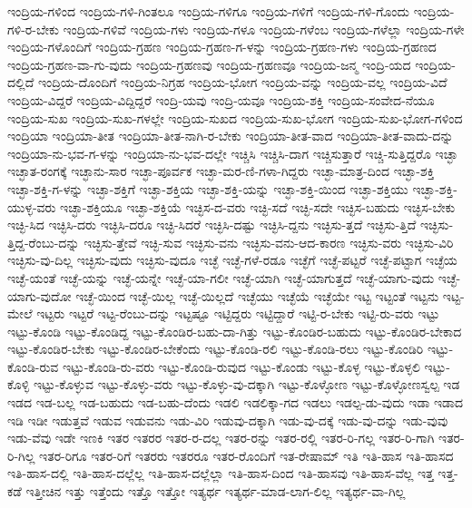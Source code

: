 {ಇಂದ್ರಿಯ-ಗಳಿಂದ
ಇಂದ್ರಿಯ-ಗಳಿ-ಗಿಂತಲೂ
ಇಂದ್ರಿಯ-ಗಳಿಗೂ
ಇಂದ್ರಿಯ-ಗಳಿಗೆ
ಇಂದ್ರಿಯ-ಗಳಿ-ಗೊಂದು
ಇಂದ್ರಿಯ-ಗಳಿ-ರ-ಬೇಕು
ಇಂದ್ರಿಯ-ಗಳಿವೆ
ಇಂದ್ರಿಯ-ಗಳು
ಇಂದ್ರಿಯ-ಗಳೂ
ಇಂದ್ರಿಯ-ಗಳೆಂಬ
ಇಂದ್ರಿಯ-ಗಳೆಲ್ಲಾ
ಇಂದ್ರಿಯ-ಗಳೇ
ಇಂದ್ರಿಯ-ಗಳೊಂದಿಗೆ
ಇಂದ್ರಿಯ-ಗ್ರಹಣ
ಇಂದ್ರಿಯ-ಗ್ರಹಣ-ಗ-ಳನ್ನು
ಇಂದ್ರಿಯ-ಗ್ರಹಣ-ಗಳು
ಇಂದ್ರಿಯ-ಗ್ರಹಣದ
ಇಂದ್ರಿಯ-ಗ್ರಹಣ-ವಾ-ಗು-ವುದು
ಇಂದ್ರಿಯ-ಗ್ರಹಣವು
ಇಂದ್ರಿಯ-ಗ್ರಹಣವೂ
ಇಂದ್ರಿಯ-ಜನ್ಮ
ಇಂದ್ರಿ-ಯದ
ಇಂದ್ರಿಯ-ದಲ್ಲಿದೆ
ಇಂದ್ರಿಯ-ದೊಂದಿಗೆ
ಇಂದ್ರಿಯ-ನಿಗ್ರಹ
ಇಂದ್ರಿಯ-ಭೋಗ
ಇಂದ್ರಿಯ-ವನ್ನು
ಇಂದ್ರಿಯ-ವಲ್ಲ
ಇಂದ್ರಿಯ-ವಿದೆ
ಇಂದ್ರಿಯ-ವಿದ್ದರೆ
ಇಂದ್ರಿಯ-ವಿದ್ದಿದ್ದರೆ
ಇಂದ್ರಿ-ಯವು
ಇಂದ್ರಿ-ಯವೂ
ಇಂದ್ರಿಯ-ಶಕ್ತಿ
ಇಂದ್ರಿಯ-ಸಂವೇದ-ನೆಯೂ
ಇಂದ್ರಿಯ-ಸುಖ
ಇಂದ್ರಿಯ-ಸುಖ-ಗಳಲ್ಲೇ
ಇಂದ್ರಿಯ-ಸುಖದ
ಇಂದ್ರಿಯ-ಸುಖ-ಭೋಗ
ಇಂದ್ರಿಯ-ಸುಖ-ಭೋಗ-ಗಳಿಂದ
ಇಂದ್ರಿಯಾ
ಇಂದ್ರಿಯಾ-ತೀತ
ಇಂದ್ರಿಯಾ-ತೀತ-ನಾಗಿ-ರ-ಬೇಕು
ಇಂದ್ರಿಯಾ-ತೀತ-ವಾದ
ಇಂದ್ರಿಯಾ-ತೀತ-ವಾದು-ದನ್ನು
ಇಂದ್ರಿಯಾ-ನು-ಭವ-ಗ-ಳನ್ನು
ಇಂದ್ರಿಯಾ-ನು-ಭವ-ದಲ್ಲೇ
ಇಚ್ಚಿಸಿ
ಇಚ್ಚಿಸಿ-ದಾಗ
ಇಚ್ಚಿಸುತ್ತಾರೆ
ಇಚ್ಚಿ-ಸುತ್ತಿದ್ದರೊ
ಇಚ್ಛಾ
ಇಚ್ಛಾತ-ರಂಗಕ್ಕೆ
ಇಚ್ಛಾನು-ಸಾರ
ಇಚ್ಛಾ-ಪೂರ್ವಕ
ಇಚ್ಛಾ-ಮರ-ಣಿ-ಗಳಾ-ಗಿದ್ದರು
ಇಚ್ಛಾ-ಮಾತ್ರ-ದಿಂದ
ಇಚ್ಛಾ-ಶಕ್ತಿ
ಇಚ್ಛಾ-ಶಕ್ತಿ-ಗ-ಳನ್ನು
ಇಚ್ಛಾ-ಶಕ್ತಿಗೆ
ಇಚ್ಛಾ-ಶಕ್ತಿಯ
ಇಚ್ಛಾ-ಶಕ್ತಿ-ಯನ್ನು
ಇಚ್ಛಾ-ಶಕ್ತಿ-ಯಿಂದ
ಇಚ್ಛಾ-ಶಕ್ತಿಯು
ಇಚ್ಛಾ-ಶಕ್ತಿ-ಯುಳ್ಳ-ವರು
ಇಚ್ಛಾ-ಶಕ್ತಿಯೂ
ಇಚ್ಛಾ-ಶಕ್ತಿಯೆ
ಇಚ್ಛಿಸ-ದ-ವರು
ಇಚ್ಛಿ-ಸದೆ
ಇಚ್ಛಿ-ಸದೇ
ಇಚ್ಛಿಸ-ಬಹುದು
ಇಚ್ಛಿಸ-ಬೇಕು
ಇಚ್ಛಿ-ಸಿದ
ಇಚ್ಛಿಸಿ-ದರು
ಇಚ್ಛಿಸಿ-ದರೂ
ಇಚ್ಛಿ-ಸಿದರೆ
ಇಚ್ಛಿಸಿ-ದಷ್ಟು
ಇಚ್ಛಿಸಿ-ದ್ದನು
ಇಚ್ಛಿಸು-ತ್ತದೆ
ಇಚ್ಛಿಸು-ತ್ತಿದೆ
ಇಚ್ಛಿಸು-ತ್ತಿದ್ದ-ರೆಂಬು-ದನ್ನು
ಇಚ್ಛಿಸು-ತ್ತೇವೆ
ಇಚ್ಛಿ-ಸುವ
ಇಚ್ಛಿಸು-ವನು
ಇಚ್ಛಿಸು-ವನು-ಆದ-ಕಾರಣ
ಇಚ್ಛಿಸು-ವರು
ಇಚ್ಛಿಸು-ವಿರಿ
ಇಚ್ಛಿಸು-ವು-ದಿಲ್ಲ
ಇಚ್ಛಿಸು-ವುದು
ಇಚ್ಛಿಸು-ವುದೂ
ಇಚ್ಛೆ
ಇಚ್ಛೆ-ಗಳೆ-ರಡೂ
ಇಚ್ಛೆಗೆ
ಇಚ್ಛೆ-ಪಟ್ಟರೆ
ಇಚ್ಛೆ-ಪಟ್ಟಾಗ
ಇಚ್ಛೆಯ
ಇಚ್ಛೆ-ಯಂತೆ
ಇಚ್ಛೆ-ಯನ್ನು
ಇಚ್ಛೆ-ಯನ್ನೇ
ಇಚ್ಛೆ-ಯಾ-ಗಲೀ
ಇಚ್ಛೆ-ಯಾಗಿ
ಇಚ್ಛೆ-ಯಾಗುತ್ತದೆ
ಇಚ್ಛೆ-ಯಾಗು-ವುದು
ಇಚ್ಛೆ-ಯಾಗು-ವುದೋ
ಇಚ್ಛೆ-ಯಿಂದ
ಇಚ್ಛೆ-ಯಿಲ್ಲ
ಇಚ್ಛೆ-ಯಿಲ್ಲದೆ
ಇಚ್ಛೆಯು
ಇಚ್ಛೆಯೆ
ಇಚ್ಛೆಯೇ
ಇಟ್ಟ
ಇಟ್ಟಂತೆ
ಇಟ್ಟನು
ಇಟ್ಟ-ಮೇಲೆ
ಇಟ್ಟರು
ಇಟ್ಟರೆ
ಇಟ್ಟ-ರೆಂಬು-ದನ್ನು
ಇಟ್ಟಷ್ಟೂ
ಇಟ್ಟಿದ್ದರು
ಇಟ್ಟಿದ್ದಾರೆ
ಇಟ್ಟಿ-ರ-ಬೇಕು
ಇಟ್ಟಿ-ರು-ವರು
ಇಟ್ಟು
ಇಟ್ಟು-ಕೊಂಡಿ
ಇಟ್ಟು-ಕೊಂಡಿದ್ದ
ಇಟ್ಟು-ಕೊಂಡಿರ-ಬಹು-ದಾ-ಗಿತ್ತು
ಇಟ್ಟು-ಕೊಂಡಿರ-ಬಹುದು
ಇಟ್ಟು-ಕೊಂಡಿರ-ಬೇಕಾದ
ಇಟ್ಟು-ಕೊಂಡಿರ-ಬೇಕು
ಇಟ್ಟು-ಕೊಂಡಿರ-ಬೇಕೆಂದು
ಇಟ್ಟು-ಕೊಂಡಿ-ರಲಿ
ಇಟ್ಟು-ಕೊಂಡಿ-ರಲು
ಇಟ್ಟು-ಕೊಂಡಿರಿ
ಇಟ್ಟು-ಕೊಂಡಿ-ರುವ
ಇಟ್ಟು-ಕೊಂಡಿ-ರು-ವರು
ಇಟ್ಟು-ಕೊಂಡಿ-ರುವುದ
ಇಟ್ಟು-ಕೊಂಡು
ಇಟ್ಟು-ಕೊಳ್ಳ
ಇಟ್ಟು-ಕೊಳ್ಳಲಿ
ಇಟ್ಟು-ಕೊಳ್ಳಿ
ಇಟ್ಟು-ಕೊಳ್ಳುವ
ಇಟ್ಟು-ಕೊಳ್ಳು-ವರು
ಇಟ್ಟು-ಕೊಳ್ಳು-ವು-ದಕ್ಕಾಗಿ
ಇಟ್ಟು-ಕೊಳ್ಳೋಣ
ಇಟ್ಟು-ಕೊಳ್ಳೋಣಸ್ವಲ್ಪ
ಇಡ
ಇಡದ
ಇಡ-ಬಲ್ಲ
ಇಡ-ಬಹುದು
ಇಡ-ಬಹು-ದೆಂದು
ಇಡಲಿ
ಇಡಲಿಕ್ಕಾ-ಗದ
ಇಡಲು
ಇಡಲ್ಪ-ಡು-ವುದು
ಇಡಾ
ಇಡಾದ
ಇಡಿ
ಇಡೀ
ಇಡುತ್ತವೆ
ಇಡುವ
ಇಡುವನು
ಇಡು-ವಿರಿ
ಇಡುವು-ದಕ್ಕಾಗಿ
ಇಡು-ವು-ದಕ್ಕೆ
ಇಡು-ವು-ದನ್ನು
ಇಡು-ವುವು
ಇಡು-ವೆವು
ಇಡೇ
ಇಣಕಿ
ಇತರ
ಇತರರ
ಇತರ-ರ-ದಲ್ಲ
ಇತರ-ರನ್ನು
ಇತರ-ರಲ್ಲಿ
ಇತರ-ರಿ-ಗಲ್ಲ
ಇತರ-ರಿ-ಗಾಗಿ
ಇತರ-ರಿ-ಗಿಲ್ಲ
ಇತರ-ರಿಗೂ
ಇತರ-ರಿಗೆ
ಇತರರು
ಇತರರೂ
ಇತರ-ರೊಂದಿಗೆ
ಇತ-ರೇಷಾಮ್
ಇತಿ
ಇತಿ-ಹಾಸ
ಇತಿ-ಹಾಸದ
ಇತಿ-ಹಾಸ-ದಲ್ಲಿ
ಇತಿ-ಹಾಸ-ದಲ್ಲೆಲ್ಲ
ಇತಿ-ಹಾಸ-ದಲ್ಲೆಲ್ಲಾ
ಇತಿ-ಹಾಸ-ದಿಂದ
ಇತಿ-ಹಾಸವು
ಇತಿ-ಹಾಸ-ವೆಲ್ಲ
ಇತ್ತ
ಇತ್ತ-ಕಡೆ
ಇತ್ತೀಚಿನ
ಇತ್ತು
ಇತ್ತೆಂದು
ಇತ್ತೊ
ಇತ್ತೋ
ಇತ್ಯರ್ಥ
ಇತ್ಯರ್ಥ-ಮಾಡ-ಲಾಗ-ಲಿಲ್ಲ
ಇತ್ಯರ್ಥ-ವಾ-ಗಿಲ್ಲ
}
